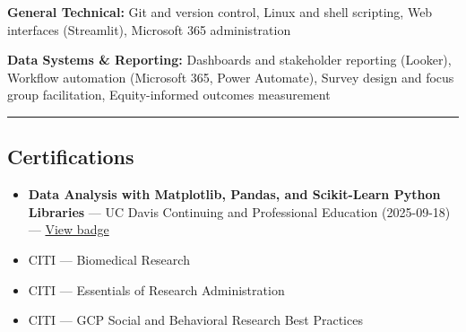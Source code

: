 \documentclass[11pt]{article}
\begin{document}
\textbf{General Technical:} Git and version control, Linux and shell
scripting, Web interfaces (Streamlit), Microsoft 365 administration

\textbf{Data Systems \& Reporting:} Dashboards and stakeholder reporting
(Looker), Workflow automation (Microsoft 365, Power Automate), Survey
design and focus group facilitation, Equity-informed outcomes
measurement

\begin{center}\rule{0.5\linewidth}{0.5pt}\end{center}

\subsection{Certifications}\label{certifications}

\begin{itemize}
\tightlist
\item
  \textbf{Data Analysis with Matplotlib, Pandas, and Scikit-Learn Python
  Libraries} --- UC Davis Continuing and Professional Education
  (2025-09-18) ---
  \href{https://www.credly.com/badges/505ef11c-58b4-48bd-aa9e-5a21f0247d46/public_url}{View
  badge}
\item
  CITI --- Biomedical Research
\item
  CITI --- Essentials of Research Administration
\item
  CITI --- GCP Social and Behavioral Research Best Practices
\end{itemize}
\end{document}
